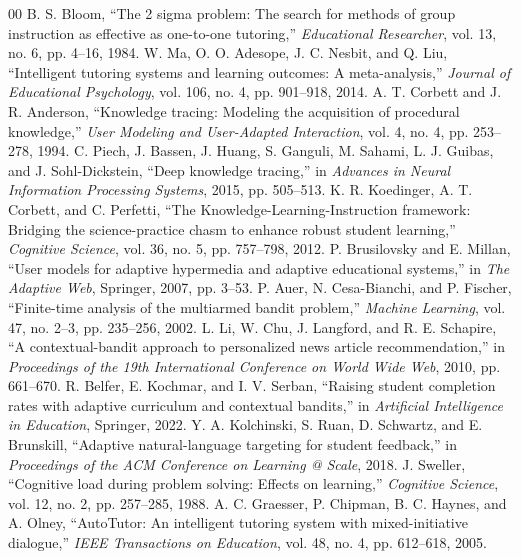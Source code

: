 \documentclass[conference]{IEEEtran}
\begin{document}
\begin{thebibliography}{00}
 B. S. Bloom, ``The 2 sigma problem: The search for methods of group instruction as effective as one-to-one tutoring,'' \emph{Educational Researcher}, vol. 13, no. 6, pp. 4--16, 1984.
 W. Ma, O. O. Adesope, J. C. Nesbit, and Q. Liu, ``Intelligent tutoring systems and learning outcomes: A meta-analysis,'' \emph{Journal of Educational Psychology}, vol. 106, no. 4, pp. 901--918, 2014.
 A. T. Corbett and J. R. Anderson, ``Knowledge tracing: Modeling the acquisition of procedural knowledge,'' \emph{User Modeling and User-Adapted Interaction}, vol. 4, no. 4, pp. 253--278, 1994.
 C. Piech, J. Bassen, J. Huang, S. Ganguli, M. Sahami, L. J. Guibas, and J. Sohl-Dickstein, ``Deep knowledge tracing,'' in \emph{Advances in Neural Information Processing Systems}, 2015, pp. 505--513.
 K. R. Koedinger, A. T. Corbett, and C. Perfetti, ``The Knowledge-Learning-Instruction framework: Bridging the science-practice chasm to enhance robust student learning,'' \emph{Cognitive Science}, vol. 36, no. 5, pp. 757--798, 2012.
 P. Brusilovsky and E. Millan, ``User models for adaptive hypermedia and adaptive educational systems,'' in \emph{The Adaptive Web}, Springer, 2007, pp. 3--53.
 P. Auer, N. Cesa-Bianchi, and P. Fischer, ``Finite-time analysis of the multiarmed bandit problem,'' \emph{Machine Learning}, vol. 47, no. 2--3, pp. 235--256, 2002.
 L. Li, W. Chu, J. Langford, and R. E. Schapire, ``A contextual-bandit approach to personalized news article recommendation,'' in \emph{Proceedings of the 19th International Conference on World Wide Web}, 2010, pp. 661--670.
 R. Belfer, E. Kochmar, and I. V. Serban, ``Raising student completion rates with adaptive curriculum and contextual bandits,'' in \emph{Artificial Intelligence in Education}, Springer, 2022.
 Y. A. Kolchinski, S. Ruan, D. Schwartz, and E. Brunskill, ``Adaptive natural-language targeting for student feedback,'' in \emph{Proceedings of the ACM Conference on Learning @ Scale}, 2018.
 J. Sweller, ``Cognitive load during problem solving: Effects on learning,'' \emph{Cognitive Science}, vol. 12, no. 2, pp. 257--285, 1988.
 A. C. Graesser, P. Chipman, B. C. Haynes, and A. Olney, ``AutoTutor: An intelligent tutoring system with mixed-initiative dialogue,'' \emph{IEEE Transactions on Education}, vol. 48, no. 4, pp. 612--618, 2005.

\end{thebibliography}
\end{document}
